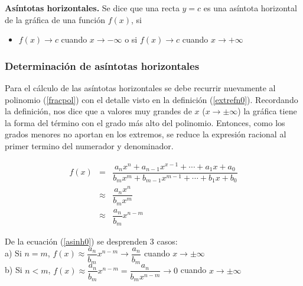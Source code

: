 \begin{mydef}
\textbf{Asíntotas horizontales. } Se dice que una recta $y=c$ es una asíntota horizontal de la gráfica de una función $f(x)$, si
\begin{itemize}
	\item $f(x)\rightarrow c$ cuando $x\rightarrow -\infty $ o si $f(x)\rightarrow c$ cuando $x\rightarrow +\infty $
\end{itemize}
\end{mydef}


\subsubsection{Determinación de asíntotas horizontales}
 Para el cálculo de las asíntotas horizontales se debe recurrir nuevamente al polinomio (\ref{fracpol}) con el detalle visto en la definición (\ref{extrefn0}). Recordando la definición, nos dice que a valores muy grandes de $x$ ($x\rightarrow \pm\infty$) la gráfica tiene la forma del término con el grado más alto del polinomio. Entonces, como los grados menores no aportan en los extremos, se reduce la expresión racional al primer termino del numerador y denominador. 

\begin{eqnarray}
f(x)&=&\dfrac{a_{n}x^{n}+a_{n-1}x^{x-1}+\cdots +a_{1}x+a_{0}}{b_{m}x^{m}+b_{m-1}x^{m-1}+\cdots + b_{1}x+b_{0}}\nonumber\\
&\approx &\dfrac{a_{n}x^{n}}{b_{m}x^{m}}\nonumber\\
&\approx & \dfrac{a_{n}}{b_{m}}x^{n-m}
\label{asinh0}
\end{eqnarray}

De la ecuación (\ref{asinh0}) se desprenden 3 casos:\\

\noindent a) Si $n=m$, $f(x)\approx \dfrac{a_{n}}{b_{m}}x^{n-m}\rightarrow \dfrac{a_{n}}{b_{m}}$ cuando $x\rightarrow \pm\infty$\\

\noindent b) Si $n<m$, $f(x)\approx \dfrac{a_{n}}{b_{m}}x^{n-m}= \dfrac{a_{n}}{b_{m}x^{n-m}}\rightarrow 0$ cuando $x\rightarrow \pm\infty$\\

